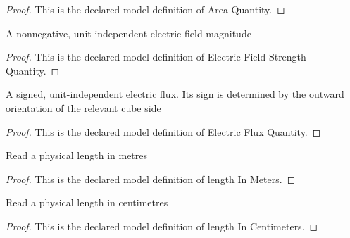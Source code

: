 \begin{proof}
  This is the declared model definition of Area Quantity.
\end{proof}
\begin{definition}
  \label{def:physics:phyx-mini-0850:phyxminiproblems-problemphyxmini0850-electricfieldstrengthquantity}
  A nonnegative, unit-independent electric-field magnitude
\end{definition}
\begin{proof}
  This is the declared model definition of Electric Field Strength Quantity.
\end{proof}
\begin{definition}
  \label{def:physics:phyx-mini-0850:phyxminiproblems-problemphyxmini0850-electricfluxquantity}
  A signed, unit-independent electric flux. Its sign is determined by the outward orientation of the relevant cube side
\end{definition}
\begin{proof}
  This is the declared model definition of Electric Flux Quantity.
\end{proof}
\begin{definition}
  \label{def:physics:phyx-mini-0850:phyxminiproblems-problemphyxmini0850-lengthinmeters}
  Read a physical length in metres
\end{definition}
\begin{proof}
  This is the declared model definition of length In Meters.
\end{proof}
\begin{definition}
  \label{def:physics:phyx-mini-0850:phyxminiproblems-problemphyxmini0850-lengthincentimeters}
  Read a physical length in centimetres
\end{definition}
\begin{proof}
  This is the declared model definition of length In Centimeters.
\end{proof}
